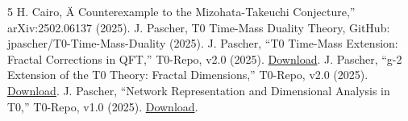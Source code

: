 	

			\begin{thebibliography}{5}
			 H. Cairo, Ä Counterexample to the Mizohata-Takeuchi Conjecture,'' arXiv:2502.06137 (2025).
			 J. Pascher, T0 Time-Mass Duality Theory, GitHub: jpascher/T0-Time-Mass-Duality (2025).
			 J. Pascher, ``T0 Time-Mass Extension: Fractal Corrections in QFT,'' T0-Repo, v2.0 (2025). \href{https://github.com/jpascher/T0-Time-Mass-Duality/raw/main/2/tex/T0_tm-erweiterung-x6_De.tex}{Download}.
			 J. Pascher, ``g-2 Extension of the T0 Theory: Fractal Dimensions,'' T0-Repo, v2.0 (2025). \href{https://github.com/jpascher/T0-Time-Mass-Duality/raw/main/2/tex/T0_g2-erweiterung-4_De.tex}{Download}.
			 J. Pascher, ``Network Representation and Dimensional Analysis in T0,'' T0-Repo, v1.0 (2025). \href{https://github.com/jpascher/T0-Time-Mass-Duality/raw/main/2/tex/T0_netze_De.tex}{Download}.
		\end{thebibliography}

	